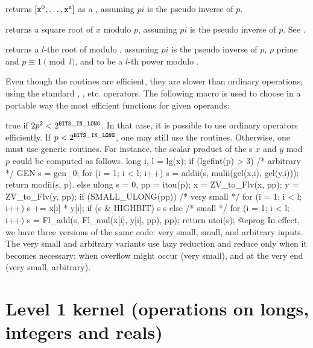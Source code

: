  returns
$[{\tt x}^0, \dots, {\tt x}^{\tt n}]$ as a , assuming $pi$ is the
pseudo inverse of $p$.

 returns a square root
of $x$ modulo $p$, assuming $pi$ is the pseudo inverse of $p$.
See .

returns a $l$-the root of 
modulo , assuming $pi$ is the pseudo inverse of $p$,
$p$ prime and $p \equiv 1 \pmod{l}$, and  to be a $l$-th power modulo
.


Even though the  routines are efficient, they are slower than
ordinary  operations, using the standard \kbd{+}, \kbd{\%}, etc.
operators.
The following macro is used to choose in a portable way the most efficient
functions for given operands:

 true if $2p^2 <2^{\tt BITS\_IN\_LONG}$. In that case, it is
possible to use ordinary operators efficiently. If $p < 2^{\tt BITS\_IN\_LONG}$, one
may still use the  routines. Otherwise, one must use generic
routines. For instance, the scalar product of the s $x$ and $y$ mod
$p$ could be computed as follows.
\bprog
    long i, l = lg(x);
    if (lgefint(p) > 3)
    { /* arbitrary */
      GEN s = gen_0;
      for (i = 1; i < l; i++) s = addii(s, mulii(gel(x,i), gel(y,i)));
      return modii(s, p).
    }
    else
    {
      ulong s = 0, pp = itou(p);
      x = ZV_to_Flv(x, pp);
      y = ZV_to_Flv(y, pp);
      if (SMALL_ULONG(pp))
      { /* very small */
        for (i = 1; i < l; i++)
        {
          s += x[i] * y[i];
          if (s & HIGHBIT) s %
        }
        s %
      }
      else
      { /* small */
        for (i = 1; i < l; i++)
          s = Fl_add(s, Fl_mul(x[i], y[i], pp), pp);
      }
      return utoi(s);
    }
@eprog\noindent
In effect, we have three versions of the same code: very small, small, and
arbitrary inputs. The very small and arbitrary variants use lazy reduction
and reduce only when it becomes necessary: when overflow might occur (very
small), and at the very end (very small, arbitrary).

\section{Level 1 kernel (operations on longs, integers and reals)}


